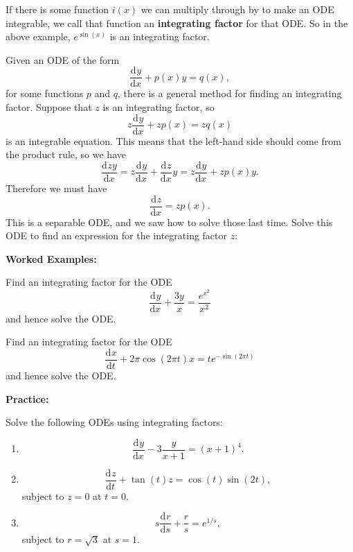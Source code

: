\documentclass{article}
\newcommand{\deriv}[3][]{\frac{\mathrm{d}^{#1}#2}{\mathrm{d}#3^{#1}}}
\begin{document}
\bigskip

If there is some function $i(x)$ we can multiply through by to make an ODE integrable, we call that function an \textbf{integrating factor} for that ODE. So in the above example, $e^{\sin(x)}$ is an integrating factor.

Given an ODE of the form
\[\deriv{y}{x}+p(x)y=q(x),\]
for some functions $p$ and $q$, there is a general method for finding an integrating factor. Suppose that $z$ is an integrating factor, so
\[z\deriv{y}{x}+zp(x)=zq(x)\]
is an integrable equation. This means that the left-hand side should come from the product rule, so we have
\[\deriv{zy}{x}=z\deriv{y}{x}+\deriv{z}{x}y=z\deriv{y}{x}+zp(x)y.\]
Therefore we must have
\[\deriv{z}{x}=zp(x).\]
This is a separable ODE, and we saw how to solve those last time. Solve this ODE to find an expression for the integrating factor $z$:







\clearpage





\textbf{Worked Examples:}

\vspace{5mm}


Find an integrating factor for the ODE
\[\deriv{y}{x}+\frac{3y}{x}=\frac{e^{x^2}}{x^2}\]
and hence solve the ODE.


\vfill


Find an integrating factor for the ODE
\[\deriv{x}{t}+2\pi \cos(2\pi t)x=te^{-\sin(2\pi t)}\]
and hence solve the ODE.

\vfill



\clearpage




\textbf{Practice:}\bigskip


Solve the following ODEs using integrating factors:

\begin{enumerate}
	\item \[\deriv{y}{x}-3\frac{y}{x+1}=(x+1)^4.\]
	\item \[\deriv{z}{t}+\tan(t)z=\cos(t)\sin(2t),\]
		subject to $z=0$ at $t=0$.
	\item \[s\deriv{r}{s}+\frac{r}{s}=e^{1/s},\]
		subject to $r=\sqrt{3}$ at $s=1$.
\end{enumerate}
\end{document}
